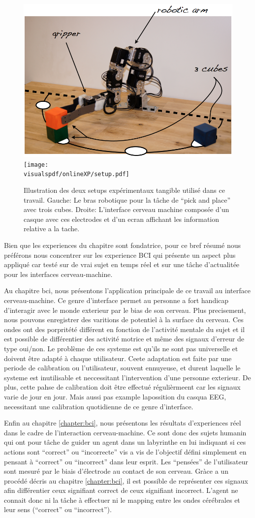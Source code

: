 \begin{figure}[!htbp]
  \centering
  \includegraphics[width=0.49\columnwidth]{chapters/lfui/img/setup.png}
  \texttt{[image: \\visualspdf/onlineXP/setup.pdf]}
  \caption{Illustration des deux setups expérimentaux tangible utilisé dans ce travail. Gauche: Le bras robotique pour la tâche de ``pick and place'' avec trois cubes. Droite: L'interface cerveau machine composée d'un casque avec ces electrodes et d'un ecran affichant les information relative a la tache.}
  \label{fig:setupfrench}
\end{figure}

Bien que les experiences du chapitre sont fondatrice, pour ce bref résumé nous préférons nous concentrer sur les experience BCI qui présente un aspect plus appliqué car testé sur de vrai sujet en temps réel et sur une tâche d'actualitée pour les interfaces cerveau-machine.

Au chapitre bci, nous présentons l'application principale de ce travail au interface cerveau-machine. Ce genre d'interface permet au personne a fort handicap d'interagir avec le monde exterieur par le bias de son cerveau. Plus precisement, nous pouvons enregistrer des varitions de potentiel à la surface du cerveau. Ces ondes ont des porpritété différent en fonction de l'activité mentale du sujet et il est possible de différentier des activité motrice et même des signaux d'erreur de type oui/non. Le problème de ces systeme est qu'ils ne sont pas universelle et doivent être adapté à chaque utilisateur. Ceete adaptation est faite par une periode de calibration ou l'utilisateur, souvent ennuyeuse, et durent laquelle le systeme est inutilisable et neccessitant l'intervention d'une personne exterieur. De plus, cette pahse de calibration doit être effectué régulièrmeent car les signaux varie de jour en jour. Mais aussi pas example lapossition du casqua EEG, necessitant une calibration quotidienne de ce genre d'interface.

Enfin au chapitre \ref{chapter:bci}, nous présentons les résultats d'experiences réel dans le cadre de l'interaction cerveau-machine. Ce sont donc des sujets humanin qui ont pour tâche de guider un agent dans un labyrinthe en lui indiquant si ces actions sont ``correct''  ou ``incorrecte'' vis a vis de l'objectif défini simplement en pensant à ``correct'' ou ``incorrect'' dans leur esprit. Les ``pensées'' de l'utilisateur sont mesuré par le biais d'électrode au contact de son cerveau. Gràce a un procédé décris au chapitre \ref{chapter:bci}, il est possible de représenter ces signaux afin différentier ceux signifiant correct de ceux signifiant incorrect. L'agent ne connait donc ni la tâche à effectuer ni le mapping entre les ondes cérébrales et leur sens (``correct'' ou ``incorrect'').

